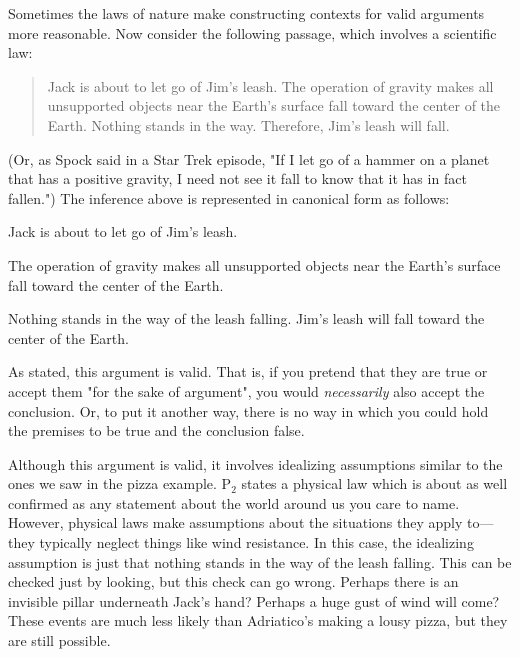 Sometimes the laws of nature make constructing contexts for valid arguments more reasonable. Now consider the following passage, which involves a scientific law:

\begin{quotation}\noindent Jack is about to let go of Jim's leash. The operation of gravity makes all unsupported objects near the Earth's surface fall toward the center of the Earth. Nothing stands in the way. Therefore, Jim's leash will fall. \end{quotation}

(Or, as Spock said in a Star Trek episode, "If I let go of a hammer on a planet that has a positive gravity, I need not see it fall to know that it has in fact fallen.") The inference above is represented in canonical form as follows:

\begin{adjustwidth}{2em}{2em}
\begin{earg*}
\item  Jack is about to let go of Jim's leash.
\item  The operation of gravity makes all unsupported objects near the Earth's surface fall toward the center of the Earth.
\item  Nothing stands in the way of the leash falling.
\itemc  Jim's leash will fall toward the center of the Earth.
\end{earg*}
\end{adjustwidth}

As stated, this argument is valid. That is, if you pretend that they are true or accept them "for the sake of argument", you would \textit{necessarily }also accept the conclusion. Or, to put it another way, there is no way in which you could hold the premises to be true and the conclusion false.

Although this argument is valid, it involves idealizing assumptions similar to the ones we saw in the pizza example. P$_2$ states a physical law which is about as well confirmed as any statement about the world around us you care to name. However, physical laws make assumptions about the situations they apply to---they typically neglect things like wind resistance. In this case, the idealizing assumption is just that nothing stands in the way of the leash falling. This can be checked just by looking, but this check can go wrong. Perhaps there is an invisible pillar underneath Jack's hand? Perhaps a huge gust of wind will come? These events are much less likely than Adriatico's making a lousy pizza, but they are still possible.

